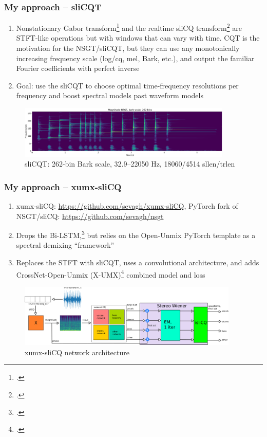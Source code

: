 \documentclass[usenames,dvipsnames]{beamer}
\begin{document}
\begin{frame}
	\frametitle{My approach -- sliCQT}
	\begin{enumerate}
	\item
		Nonstationary Gabor transform\footcite{balazs} and the realtime sliCQ transform\footcite{invertiblecqt, slicq, variableq1} are STFT-like operations but with windows that can vary with time. CQT is the motivation for the NSGT/sliCQT, but they can use any monotonically increasing frequency scale (log/cq, mel, Bark, etc.), and output the familiar Fourier coefficients with perfect inverse
	\item
		Goal: use the sliCQT to choose optimal time-frequency resolutions per frequency and boost spectral models past waveform models
	\end{enumerate}
	\begin{figure}[ht]
		\centering
		\vspace{-0.5em}
		\includegraphics[height=2.5cm]{./images-gspi/gspi_xumx_slicq_params.png}
		\vspace{-0.5em}
		\caption{sliCQT: 262-bin Bark scale, 32.9--22050 Hz, 18060/4514 sllen/trlen}
		\vspace{-0.5em}
	\end{figure}
\end{frame}

\begin{frame}
	\frametitle{My approach -- xumx-sliCQ}
	\begin{enumerate}
	\item
		xumx-sliCQ: \url{https://github.com/sevagh/xumx-sliCQ}, PyTorch fork of NSGT/sliCQ: \url{https://github.com/sevagh/nsgt}
	\item
		Drops the Bi-LSTM,\footcite{umx} but relies on the Open-Unmix PyTorch template as a spectral demixing ``framework''
	\item
		Replaces the STFT with sliCQT, uses a convolutional architecture, and adds CrossNet-Open-Unmix (X-UMX)\footcite{xumx} combined model and loss
\end{enumerate}
	\begin{figure}[ht]
		\centering
		\vspace{-1em}
		\includegraphics[height=3cm]{./images-blockdiagrams/xumx_slicq_system.png}
		\caption{xumx-sliCQ network architecture}
		\vspace{-1em}
	\end{figure}
\end{frame}
\end{document}
